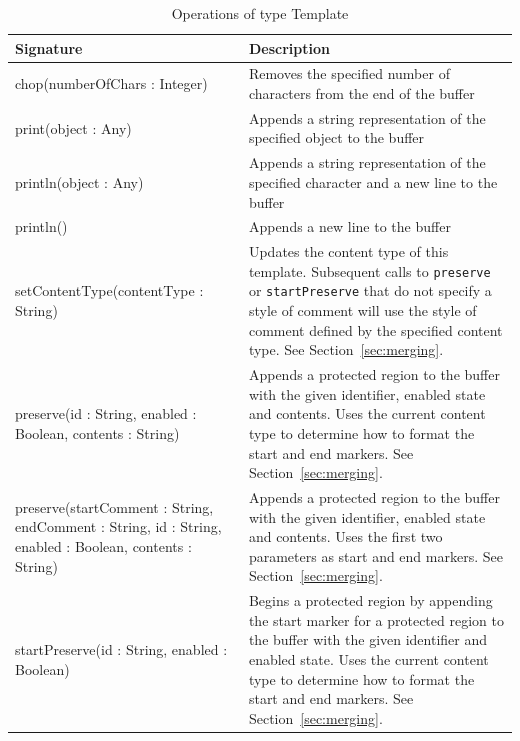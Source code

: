 \begin{longtable} {|p{5.5cm}|p{6.5cm}|}
			
			\caption{Operations of type Template}
			\label{tab:OutputBufferOperations}\\
			
			\hline
							
			\textbf{Signature} & \textbf{Description} \\\hline
			
			chop(numberOfChars : Integer) & Removes the specified number of characters from the end of the buffer \\\hline
			
			print(object : Any) & Appends a string representation of the specified object to the buffer \\\hline
			
			println(object : Any) & Appends a string representation of the specified character and a new line to the buffer \\\hline
			
			println() & Appends a new line to the buffer \\\hline
			
			setContentType(contentType : String) & Updates the content type of this template. Subsequent calls to \texttt{pr\-es\-er\-ve} or \texttt{st\-a\-rtPr\-es\-er\-ve} that do not specify a style of comment will use the style of comment defined by the specified content type. See Section~\ref{sec:merging}. \\\hline
			
			preserve(id : String, enabled : Boolean, contents : String) & Appends a protected region to the buffer with the given identifier, enabled state and contents. Uses the current content type to determine how to format the start and end markers. See Section~\ref{sec:merging}. \\\hline
			
			preserve(startComment : String, endComment : String, id : String, enabled : Boolean, contents : String) & Appends a protected region to the buffer with the given identifier, enabled state and contents. Uses the first two parameters as start and end markers. See Section~\ref{sec:merging}. \\\hline
			
			startPreserve(id : String, enabled : Boolean) & Begins a protected region by appending the start marker for a protected region to the buffer with the given identifier and enabled state. Uses the current content type to determine how to format the start and end markers. See Section~\ref{sec:merging}. \\\hline
			

\end{longtable}
